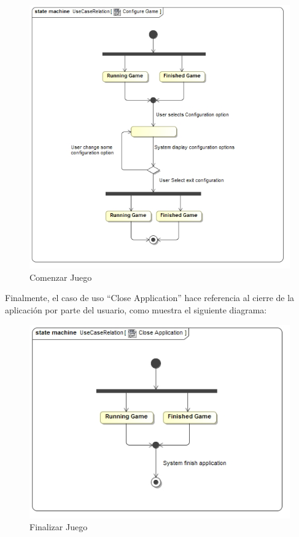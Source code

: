 \documentclass[11pt]{article}
\begin{document}
\begin{center}
 \begin{figure}[H]
 \begin{center}
   \includegraphics[width=17cm]{DomainModel/ConfigureGame00.jpg}
   \caption{Comenzar Juego}
   \label{fig:startnewgame}
 \end{center}
 \end{figure}
\end{center}

Finalmente, el caso de uso ``Close Application'' hace referencia al cierre de la aplicación por parte del usuario, como muestra el siguiente diagrama:

\begin{center}
 \begin{figure}[H]
 \begin{center}
   \includegraphics[width=15cm]{DomainModel/CloseApplication00.jpg}
   \caption{Finalizar Juego}
   \label{fig:finishgame}
 \end{center}
 \end{figure}
\end{center}
\end{document}
